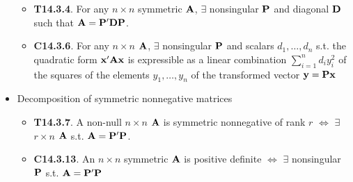 \documentclass[a4paper, oneside]{book}
\begin{document}
\begin{itemize}
\begin{itemize}
	\item \textbf{T14.3.4}. For any $n\times n$ symmetric $\mathbf{A}$, $\exists$ nonsingular $\mathbf{P}$ and diagonal $\mathbf{D}$ such that $\mathbf{A}=\mathbf{P'DP}$.
	\item \textbf{C14.3.6}. For any $n\times n$ $\mathbf{A}$, $\exists$ nonsingular $\mathbf{P}$ and scalars $d_1, \hdots, d_n$ s.t. the quadratic form $\mathbf{x'Ax}$ is expressible as a linear combination $\sum_{i=1}^n d_i y_i^2$ of the squares of the elements $y_1, \hdots, y_n$ of the transformed vector $\mathbf{y=Px}$
	\end{itemize}
\item Decomposition of symmetric nonnegative matrices
	\begin{itemize}
	\item \textbf{T14.3.7}. A non-null $n\times n$ $\mathbf{A}$ is symmetric nonnegative of rank $r$ $\iff$ $\exists$ $r\times n$ $\mathbf{A}$ s.t. $\mathbf{A}=\mathbf{P'P}$.
	\item \textbf{C14.3.13}. An $n\times n$  symmetric $\mathbf A$ is positive definite $\iff$ $\exists$ nonsingular $\mathbf{P}$ s.t. $\mathbf{A=P'P}$
	\end{itemize}
\end{itemize}
\end{document}
